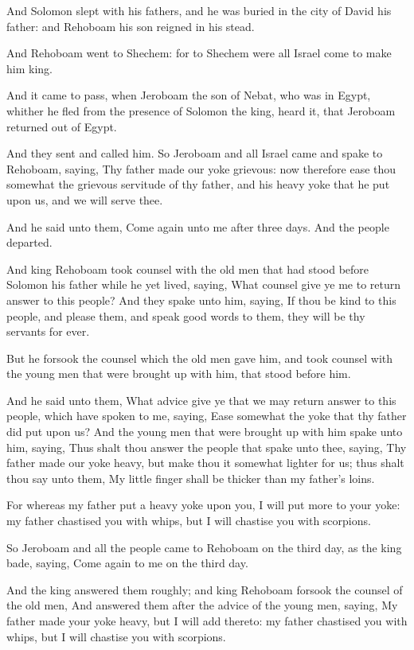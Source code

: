 \Verse And Solomon slept with his fathers, and he was buried in the city of David his father: and Rehoboam his son reigned in his stead.


\Chapter
\Verse And Rehoboam went to Shechem: for to Shechem were all Israel come to make him king.

\Verse And it came to pass, when Jeroboam the son of Nebat, who was in Egypt, whither he fled from the presence of Solomon the king, heard it, that Jeroboam returned out of Egypt.

\Verse And they sent and called him. So Jeroboam and all Israel came and spake to Rehoboam, saying, \Verse Thy father made our yoke grievous: now therefore ease thou somewhat the grievous servitude of thy father, and his heavy yoke that he put upon us, and we will serve thee.

\Verse And he said unto them, Come again unto me after three days. And the people departed.

\Verse And king Rehoboam took counsel with the old men that had stood before Solomon his father while he yet lived, saying, What counsel give ye me to return answer to this people?  \Verse And they spake unto him, saying, If thou be kind to this people, and please them, and speak good words to them, they will be thy servants for ever.

\Verse But he forsook the counsel which the old men gave him, and took counsel with the young men that were brought up with him, that stood before him.

\Verse And he said unto them, What advice give ye that we may return answer to this people, which have spoken to me, saying, Ease somewhat the yoke that thy father did put upon us?  \Verse And the young men that were brought up with him spake unto him, saying, Thus shalt thou answer the people that spake unto thee, saying, Thy father made our yoke heavy, but make thou it somewhat lighter for us; thus shalt thou say unto them, My little finger shall be thicker than my father's loins.

\Verse For whereas my father put a heavy yoke upon you, I will put more to your yoke: my father chastised you with whips, but I will chastise you with scorpions.

\Verse So Jeroboam and all the people came to Rehoboam on the third day, as the king bade, saying, Come again to me on the third day.

\Verse And the king answered them roughly; and king Rehoboam forsook the counsel of the old men, \Verse And answered them after the advice of the young men, saying, My father made your yoke heavy, but I will add thereto: my father chastised you with whips, but I will chastise you with scorpions.

